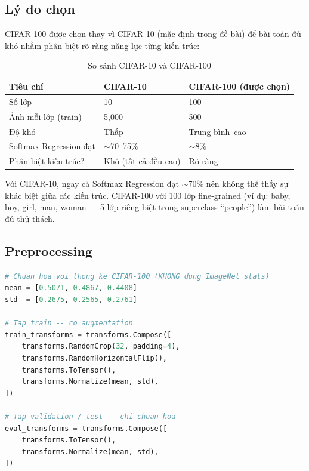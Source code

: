 \documentclass[12pt, a4paper]{article}
\begin{document}
\subsection{Lý do chọn}

CIFAR-100 được chọn thay vì CIFAR-10 (mặc định trong đề bài) để bài toán đủ khó nhằm phân biệt rõ ràng năng lực từng kiến trúc:

\begin{table}[H]
\centering
\caption{So sánh CIFAR-10 và CIFAR-100}
\begin{tabular}{lll}
\toprule
\textbf{Tiêu chí} & \textbf{CIFAR-10} & \textbf{CIFAR-100 (được chọn)} \\
\midrule
Số lớp                       & 10          & 100 \\
Ảnh mỗi lớp (train)          & 5,000       & 500 \\
Độ khó                       & Thấp        & Trung bình--cao \\
Softmax Regression đạt       & $\sim$70--75\% & $\sim$8\% \\
Phân biệt kiến trúc?         & Khó (tất cả đều cao) & Rõ ràng \\
\bottomrule
\end{tabular}
\end{table}

Với CIFAR-10, ngay cả Softmax Regression đạt $\sim$70\% nên không thể thấy sự khác biệt giữa các kiến trúc. CIFAR-100 với 100 lớp fine-grained (ví dụ: baby, boy, girl, man, woman --- 5 lớp riêng biệt trong superclass ``people'') làm bài toán đủ thử thách.

\subsection{Preprocessing}

\begin{lstlisting}[language=Python, caption={Data transforms cho CIFAR-100}]
# Chuan hoa voi thong ke CIFAR-100 (KHONG dung ImageNet stats)
mean = [0.5071, 0.4867, 0.4408]
std  = [0.2675, 0.2565, 0.2761]

# Tap train -- co augmentation
train_transforms = transforms.Compose([
    transforms.RandomCrop(32, padding=4),
    transforms.RandomHorizontalFlip(),
    transforms.ToTensor(),
    transforms.Normalize(mean, std),
])

# Tap validation / test -- chi chuan hoa
eval_transforms = transforms.Compose([
    transforms.ToTensor(),
    transforms.Normalize(mean, std),
])
\end{lstlisting}
\end{document}
